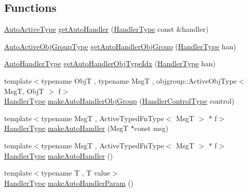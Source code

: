 \subsection*{Functions}
\begin{DoxyCompactItemize}
\item 
\hyperlink{namespacevt_1_1auto__registry_adc4d91d5c7fe1b7d36f2c490ae14c9ac}{Auto\+Active\+Type} \hyperlink{namespacevt_1_1auto__registry_a36290459adff20a355a904f1cce57268}{get\+Auto\+Handler} (\hyperlink{namespacevt_af64846b57dfcaf104da3ef6967917573}{Handler\+Type} const \&handler)
\item 
\hyperlink{namespacevt_1_1auto__registry_a861d9d01e89c81f0a955188724aa25b3}{Auto\+Active\+Obj\+Group\+Type} \hyperlink{namespacevt_1_1auto__registry_a097c75f223a97888d8157568b6ea9bd1}{get\+Auto\+Handler\+Obj\+Group} (\hyperlink{namespacevt_af64846b57dfcaf104da3ef6967917573}{Handler\+Type} han)
\item 
\hyperlink{namespacevt_1_1auto__registry_ae295e18699146815bb7d7674594d95d7}{Auto\+Handler\+Type} \hyperlink{namespacevt_1_1auto__registry_a0c47caf1e4978208704029c0d0f925f0}{get\+Auto\+Handler\+Obj\+Type\+Idx} (\hyperlink{namespacevt_af64846b57dfcaf104da3ef6967917573}{Handler\+Type} han)
\item 
{\footnotesize template$<$typename ObjT , typename MsgT , objgroup\+::\+Active\+Obj\+Type$<$ Msg\+T, Obj\+T $>$ f$>$ }\\\hyperlink{namespacevt_af64846b57dfcaf104da3ef6967917573}{Handler\+Type} \hyperlink{namespacevt_1_1auto__registry_af096c71af57c441be5d6d5f9c1dd52fd}{make\+Auto\+Handler\+Obj\+Group} (\hyperlink{namespacevt_adbbef13b92f0a93b14c219b7cc8a48f2}{Handler\+Control\+Type} control)
\item 
{\footnotesize template$<$typename MsgT , Active\+Typed\+Fn\+Type$<$ Msg\+T $>$ $\ast$ f$>$ }\\\hyperlink{namespacevt_af64846b57dfcaf104da3ef6967917573}{Handler\+Type} \hyperlink{namespacevt_1_1auto__registry_abac49a5da9edd265913ca474a6624a09}{make\+Auto\+Handler} (MsgT $\ast$const msg)
\item 
{\footnotesize template$<$typename MsgT , Active\+Typed\+Fn\+Type$<$ Msg\+T $>$ $\ast$ f$>$ }\\\hyperlink{namespacevt_af64846b57dfcaf104da3ef6967917573}{Handler\+Type} \hyperlink{namespacevt_1_1auto__registry_a965b4801e4d0aee0e5b86342c92baf68}{make\+Auto\+Handler} ()
\item 
{\footnotesize template$<$typename T , T value$>$ }\\\hyperlink{namespacevt_af64846b57dfcaf104da3ef6967917573}{Handler\+Type} \hyperlink{namespacevt_1_1auto__registry_a5253f6bb76b4c7e98416fddd05c2695e}{make\+Auto\+Handler\+Param} ()

\end{DoxyCompactItemize}
